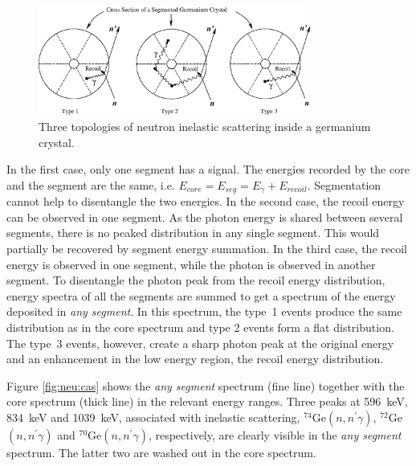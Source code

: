 \begin{figure}[tbhp]
  \centering
  \includegraphics[width=0.8\textwidth]{ine_1}
  \caption{Three topologies of neutron inelastic scattering inside a
    germanium crystal.}
  \label{fig:neu:inel}
\end{figure}

In the first case, only one segment has a signal. The energies
recorded by the core and the segment are the same, i.e. $E_{core} =
E_{seg} = E_{\gamma} + E_{recoil}$. Segmentation cannot help to
disentangle the two energies. In the second case, the recoil energy
can be observed in one segment. As the photon energy is shared between
several segments, there is no peaked distribution in any single
segment. This would partially be recovered by segment energy
summation. In the third case, the recoil energy is observed in one
segment, while the photon is observed in another segment. To
disentangle the photon peak from the recoil energy distribution,
energy spectra of all the segments are summed to get a spectrum of the
energy deposited in \emph{any segment}. In this spectrum, the type~1
events produce the same distribution as in the core spectrum and type
2 events form a flat distribution. The type~3 events, however, create
a sharp photon peak at the original energy and an enhancement in the
low energy region, the recoil energy distribution.

Figure \ref{fig:neu:cas} shows the \emph{any segment} spectrum (fine line) together with the core spectrum (thick line) in the relevant energy ranges. Three peaks at 596~keV, 834~keV and 1039~keV, associated with inelastic scattering, $^{74}$Ge$(n, n^\prime\gamma)$, $^{72}$Ge$(n, n^\prime\gamma)$ and $^{70}$Ge$(n, n^\prime\gamma)$, respectively, are clearly visible in the \emph{any segment} spectrum. The latter two are washed out in the core spectrum.

